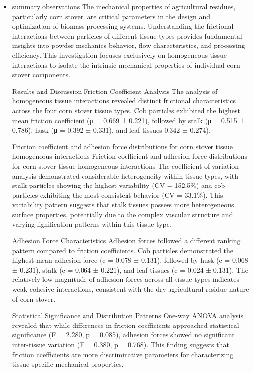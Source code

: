 \documentclass[xcolor=dvipsnames,10pt,hidelinks]{article}
\begin{document}
\begin{itemize}
\item summary observations
\label{sec:org9330502}
\newline
\begingroup\footnotesize
The mechanical properties of agricultural residues, particularly corn stover, are critical parameters in the design and optimization of biomass processing systems. Understanding the frictional interactions between particles of different tissue types provides fundamental insights into powder mechanics behavior, flow characteristics, and processing efficiency. This investigation focuses exclusively on homogeneous tissue interactions to isolate the intrinsic mechanical properties of individual corn stover components.

Results and Discussion
Friction Coefficient Analysis
The analysis of homogeneous tissue interactions revealed distinct frictional characteristics across the four corn stover tissue types. Cob particles exhibited the highest mean friction coefficient (μ = 0.669 ± 0.221), followed by stalk (μ = 0.515 ± 0.786), husk (μ = 0.392 ± 0.331), and leaf tissues 0.342 ± 0.274).

Friction coefficient and adhesion force distributions for corn stover tissue homogeneous interactions
Friction coefficient and adhesion force distributions for corn stover tissue homogeneous interactions
The coefficient of variation analysis demonstrated considerable heterogeneity within tissue types, with stalk particles showing the highest variability (CV = 152.5\%) and cob particles exhibiting the most consistent behavior (CV = 33.1\%). This variability pattern suggests that stalk tissues possess more heterogeneous surface properties, potentially due to the complex vascular structure and varying lignification patterns within this tissue type.

Adhesion Force Characteristics
Adhesion forces followed a different ranking pattern compared to friction coefficients. Cob particles demonstrated the highest mean adhesion force (c = 0.078 ± 0.131), followed by husk (c = 0.068 ± 0.231), stalk (c = 0.064 ± 0.221), and leaf tissues (c = 0.024 ± 0.131). The relatively low magnitude of adhesion forces across all tissue types indicates weak cohesive interactions, consistent with the dry agricultural residue nature of corn stover.

Statistical Significance and Distribution Patterns
One-way ANOVA analysis revealed that while differences in friction coefficients approached statistical significance (F = 2.280, p = 0.085), adhesion forces showed no significant inter-tissue variation (F = 0.380, p = 0.768). This finding suggests that friction coefficients are more discriminative parameters for characterizing tissue-specific mechanical properties.


\end{itemize}
\end{document}
